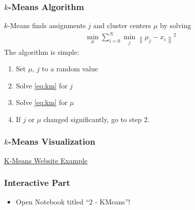 \begin{frame}
    \frametitle{$k$-Means Algorithm}
    $k$-Means finds assignments $j$ and cluster centers $\mu$ by solving
    \begin{align}
        \min_{\mu}\sum_{i=0}^{N} \min_j\left\|\mu_j-x_i\right\|^2
        \label{eq:km}
    \end{align}
    The algorithm is simple:
    \begin{enumerate}
        \item Set $\mu$, $j$ to a random value
        \item Solve \eqref{eq:km} for $j$
        \item Solve \eqref{eq:km} for $\mu$
        \item If $j$ or $\mu$ changed significantly, go to step 2.
    \end{enumerate}
\end{frame}

\begin{frame}
    \frametitle{$k$-Means Visualization}
    \begin{center}
    \href{http://icperformance.com/wp-content/demos/kmeansmouse.html}{K-Means 
        Website Example}
    \end{center}
\end{frame}

\begin{frame}
  \frametitle{Interactive Part}
  \begin{itemize}
      \item Open Notebook titled ``2 - KMeans''!
  \end{itemize}
\end{frame}
